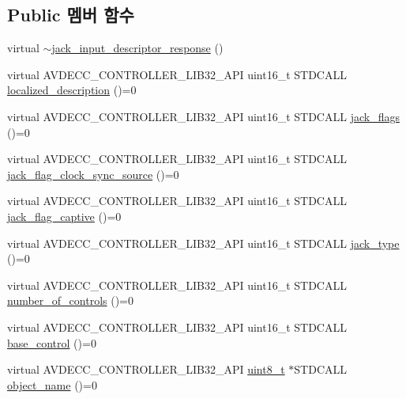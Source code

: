 \subsection*{Public 멤버 함수}
\begin{DoxyCompactItemize}
\item 
virtual \hyperlink{classavdecc__lib_1_1jack__input__descriptor__response_a4f2e82d3c2232c7ae18c6261545e1a59}{$\sim$jack\+\_\+input\+\_\+descriptor\+\_\+response} ()
\item 
virtual A\+V\+D\+E\+C\+C\+\_\+\+C\+O\+N\+T\+R\+O\+L\+L\+E\+R\+\_\+\+L\+I\+B32\+\_\+\+A\+PI uint16\+\_\+t S\+T\+D\+C\+A\+LL \hyperlink{classavdecc__lib_1_1jack__input__descriptor__response_a1fb9de45567df344090a1407aa6b775f}{localized\+\_\+description} ()=0
\item 
virtual A\+V\+D\+E\+C\+C\+\_\+\+C\+O\+N\+T\+R\+O\+L\+L\+E\+R\+\_\+\+L\+I\+B32\+\_\+\+A\+PI uint16\+\_\+t S\+T\+D\+C\+A\+LL \hyperlink{classavdecc__lib_1_1jack__input__descriptor__response_ac61cbd97402a059269b432ee38c188a7}{jack\+\_\+flags} ()=0
\item 
virtual A\+V\+D\+E\+C\+C\+\_\+\+C\+O\+N\+T\+R\+O\+L\+L\+E\+R\+\_\+\+L\+I\+B32\+\_\+\+A\+PI uint16\+\_\+t S\+T\+D\+C\+A\+LL \hyperlink{classavdecc__lib_1_1jack__input__descriptor__response_a40688abe228ad246a130e82cc139c502}{jack\+\_\+flag\+\_\+clock\+\_\+sync\+\_\+source} ()=0
\item 
virtual A\+V\+D\+E\+C\+C\+\_\+\+C\+O\+N\+T\+R\+O\+L\+L\+E\+R\+\_\+\+L\+I\+B32\+\_\+\+A\+PI uint16\+\_\+t S\+T\+D\+C\+A\+LL \hyperlink{classavdecc__lib_1_1jack__input__descriptor__response_a9e30c02247953047ebc30d96d984a56a}{jack\+\_\+flag\+\_\+captive} ()=0
\item 
virtual A\+V\+D\+E\+C\+C\+\_\+\+C\+O\+N\+T\+R\+O\+L\+L\+E\+R\+\_\+\+L\+I\+B32\+\_\+\+A\+PI uint16\+\_\+t S\+T\+D\+C\+A\+LL \hyperlink{classavdecc__lib_1_1jack__input__descriptor__response_a045cc9fc7e74c9040e9e311485691d22}{jack\+\_\+type} ()=0
\item 
virtual A\+V\+D\+E\+C\+C\+\_\+\+C\+O\+N\+T\+R\+O\+L\+L\+E\+R\+\_\+\+L\+I\+B32\+\_\+\+A\+PI uint16\+\_\+t S\+T\+D\+C\+A\+LL \hyperlink{classavdecc__lib_1_1jack__input__descriptor__response_a5accf7abc7d231a0767ad5cac68b8b39}{number\+\_\+of\+\_\+controls} ()=0
\item 
virtual A\+V\+D\+E\+C\+C\+\_\+\+C\+O\+N\+T\+R\+O\+L\+L\+E\+R\+\_\+\+L\+I\+B32\+\_\+\+A\+PI uint16\+\_\+t S\+T\+D\+C\+A\+LL \hyperlink{classavdecc__lib_1_1jack__input__descriptor__response_ac1f5297533142234c764e84c01ce5a16}{base\+\_\+control} ()=0
\item 
virtual A\+V\+D\+E\+C\+C\+\_\+\+C\+O\+N\+T\+R\+O\+L\+L\+E\+R\+\_\+\+L\+I\+B32\+\_\+\+A\+PI \hyperlink{stdint_8h_aba7bc1797add20fe3efdf37ced1182c5}{uint8\+\_\+t} $\ast$S\+T\+D\+C\+A\+LL \hyperlink{classavdecc__lib_1_1descriptor__response__base_a133f7774946d80f82b8aaaa4cfbb7361}{object\+\_\+name} ()=0
\end{DoxyCompactItemize}


